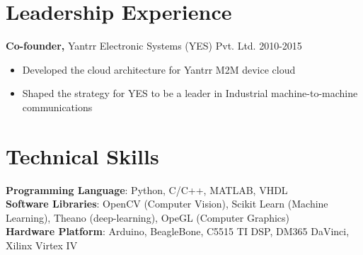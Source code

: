 \documentclass[margin]{res}
\begin{document}
\begin{resume}
\begin{itemize}
\end{itemize}



\section{Leadership   Experience} 
{\bf Co-founder,} Yantrr Electronic Systems (YES) Pvt. Ltd.     \hfill         2010-2015
\begin{itemize} \itemsep -2pt
\item Developed the cloud architecture for Yantrr M2M device cloud
\item Shaped the strategy for YES to be a leader in Industrial machine-to-machine communications
\end{itemize}

\section{Technical Skills}
{\bf Programming Language}: Python, C/C++, MATLAB, VHDL \\
{\bf Software Libraries}: OpenCV (Computer Vision), Scikit Learn (Machine Learning), Theano (deep-learning), OpeGL (Computer Graphics) \\
{\bf Hardware Platform}: Arduino, BeagleBone, C5515 TI DSP, DM365 DaVinci, Xilinx Virtex IV 


\end{resume} 
\end{document}
